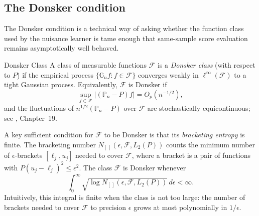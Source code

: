 \documentclass[master.tex]{subfiles}
\begin{document}
\subsection{The Donsker condition}
\label{w11:subsec:donsker}

The Donsker condition is a technical way of asking whether the
function class used by the nuisance learner is tame enough that
same-sample score evaluation remains asymptotically well behaved.

\begin{defn}{Donsker Class}
\label{w11:defn:donsker}
A class of measurable functions $\mathcal{F}$ is a
\emph{Donsker class} (with respect to $P$) if the empirical process
$\{\mathbb{G}_n f : f \in \mathcal{F}\}$ converges weakly in
$\ell^\infty(\mathcal{F})$ to a tight Gaussian process.
Equivalently, $\mathcal{F}$ is Donsker if
\[
  \sup_{f \in \mathcal{F}}
  \bigl|(\mathbb{P}_n - P) f\bigr|
  = O_p(n^{-1/2}),
\]
and the fluctuations of $n^{1/2}(\mathbb{P}_n - P)$ over
$\mathcal{F}$ are stochastically equicontinuous; see
\citet{vandervaart1998}, Chapter~19.
\end{defn}

A key sufficient condition for $\mathcal{F}$ to be Donsker is that
its \emph{bracketing entropy} is finite.  The bracketing number
$N_{[\,]}(\epsilon, \mathcal{F}, L_2(P))$ counts the minimum number
of $\epsilon$-brackets $[\ell_j, u_j]$ needed to cover
$\mathcal{F}$, where a bracket is a pair of functions with
$P(u_j - \ell_j)^2 \leq \epsilon^2$.  The class $\mathcal{F}$ is
Donsker whenever
\[
  \int_0^\infty
  \sqrt{\log N_{[\,]}(\epsilon, \mathcal{F}, L_2(P))}\,
  d\epsilon
  < \infty.
\]
Intuitively, this integral is finite when the class is not too
large: the number of brackets needed to cover $\mathcal{F}$ to
precision $\epsilon$ grows at most polynomially in $1/\epsilon$.
\end{document}
